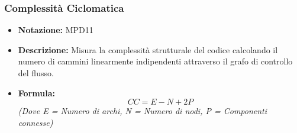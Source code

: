 \documentclass[a4paper,12pt]{article}
\begin{document}
        \subsubsection{Complessità Ciclomatica}
            \begin{itemize}
                \item \textbf{Notazione:} MPD11
                \item \textbf{Descrizione:} Misura la complessità strutturale del codice calcolando il numero di cammini linearmente indipendenti attraverso il grafo di controllo del flusso.
                \item \textbf{Formula:} 
                \[ CC = E - N + 2P \]
                \textit{\small{(Dove E = Numero di archi, N = Numero di nodi, P = Componenti connesse)}}
            \end{itemize}
\end{document}
